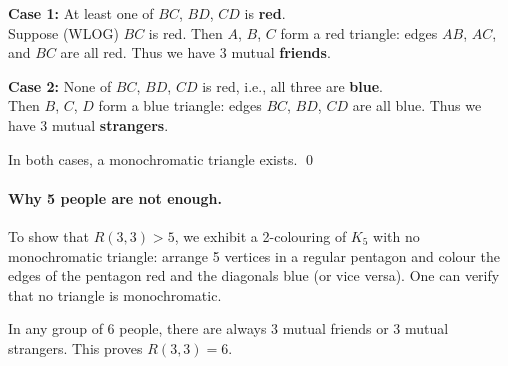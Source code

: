 \documentclass[12pt, a4paper]{article}
\begin{document}
\textbf{Case 1:} At least one of $BC$, $BD$, $CD$ is \textbf{red}.\\
Suppose (WLOG) $BC$ is red. Then $A$, $B$, $C$ form a red triangle:
edges $AB$, $AC$, and $BC$ are all red.
Thus we have 3 mutual \textbf{friends}.

\textbf{Case 2:} None of $BC$, $BD$, $CD$ is red, i.e., all three
are \textbf{blue}.\\
Then $B$, $C$, $D$ form a blue triangle: edges $BC$, $BD$, $CD$
are all blue.
Thus we have 3 mutual \textbf{strangers}.

\medskip
In both cases, a monochromatic triangle exists. \qed

\paragraph{Why 5 people are not enough.}
To show that $R(3,3) > 5$, we exhibit a 2-colouring of $K_5$
with no monochromatic triangle: arrange 5 vertices in a regular
pentagon and colour the edges of the pentagon red and the diagonals
blue (or vice versa). One can verify that no triangle is monochromatic.

\begin{center}
\end{center}

\begin{answerbox}
\centering
In any group of 6 people, there are always 3 mutual friends
or 3 mutual strangers. This proves $R(3,3) = 6$.
\end{answerbox}

\newpage
\end{document}
